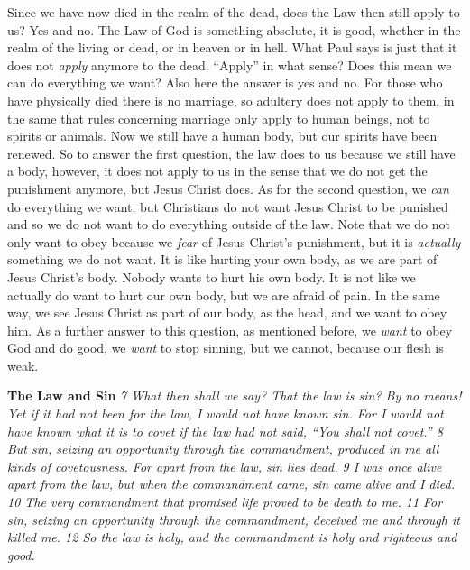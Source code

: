 Since we have now died in the realm of the dead, does the Law then still
apply to us? Yes and no. The Law of God is something absolute, it is
good, whether in the realm of the living or dead, or in heaven or in
hell. What Paul says is just that it does not \emph{apply} anymore to
the dead. ``Apply'' in what sense? Does this mean we can do everything
we want? Also here the answer is yes and no. For those who have
physically died there is no marriage, so adultery does not apply to
them, in the same that rules concerning marriage only apply to human
beings, not to spirits or animals. Now we still have a human body, but
our spirits have been renewed. So to answer the first question, the law
does to us because we still have a body, however, it does not apply to
us in the sense that we do not get the punishment anymore, but Jesus
Christ does. As for the second question, we \emph{can} do everything we
want, but Christians do not want Jesus Christ to be punished and so we
do not want to do everything outside of the law. Note that we do not
only want to obey because we \emph{fear} of Jesus Christ's punishment,
but it is \emph{actually} something we do not want. It is like hurting
your own body, as we are part of Jesus Christ's body. Nobody wants to
hurt his own body. It is not like we actually do want to hurt our own
body, but we are afraid of pain. In the same way, we see Jesus Christ as
part of our body, as the head, and we want to obey him. As a further
answer to this question, as mentioned before, we \emph{want} to obey God
and do good, we \emph{want} to stop sinning, but we cannot, because our
flesh is weak.

\textbf{The Law and Sin} \emph{7 What then shall we say? That the law is
sin? By no means! Yet if it had not been for the law, I would not have
known sin. For I would not have known what it is to covet if the law had
not said, ``You shall not covet.'' 8 But sin, seizing an opportunity
through the commandment, produced in me all kinds of covetousness. For
apart from the law, sin lies dead. 9 I was once alive apart from the
law, but when the commandment came, sin came alive and I died. 10 The
very commandment that promised life proved to be death to me. 11 For
sin, seizing an opportunity through the commandment, deceived me and
through it killed me. 12 So the law is holy, and the commandment is holy
and righteous and good.}

